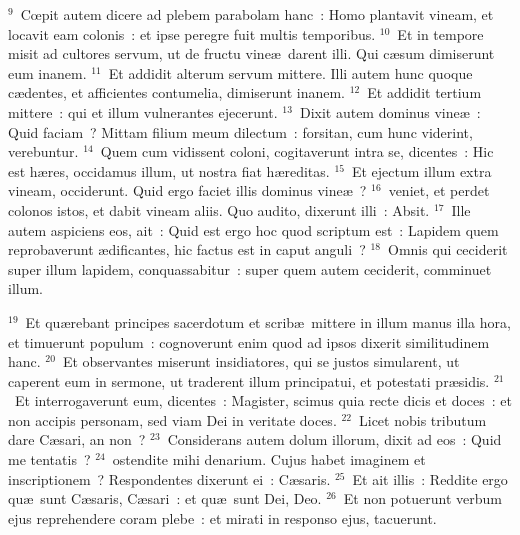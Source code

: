 ${}^{9}$~Cœpit autem dicere ad plebem parabolam hanc~: Homo plantavit vineam, et locavit eam colonis~: et ipse peregre fuit multis temporibus.
${}^{10}$~Et in tempore misit ad cultores servum, ut de fructu vine\ae\ darent illi. Qui c\ae sum dimiserunt eum inanem.
${}^{11}$~Et addidit alterum servum mittere. Illi autem hunc quoque c\ae dentes, et afficientes contumelia, dimiserunt inanem.
${}^{12}$~Et addidit tertium mittere~: qui et illum vulnerantes ejecerunt.
${}^{13}$~Dixit autem dominus vine\ae~: Quid faciam~? Mittam filium meum dilectum~: forsitan, cum hunc viderint, verebuntur.
${}^{14}$~Quem cum vidissent coloni, cogitaverunt intra se, dicentes~: Hic est h\ae res, occidamus illum, ut nostra fiat h\ae reditas.
${}^{15}$~Et ejectum illum extra vineam, occiderunt. Quid ergo faciet illis dominus vine\ae~?
${}^{16}$~veniet, et perdet colonos istos, et dabit vineam aliis. Quo audito, dixerunt illi~: Absit.
${}^{17}$~Ille autem aspiciens eos, ait~: Quid est ergo hoc quod scriptum est~: Lapidem quem reprobaverunt \ae dificantes, hic factus est in caput anguli~?
${}^{18}$~Omnis qui ceciderit super illum lapidem, conquassabitur~: super quem autem ceciderit, comminuet illum.


${}^{19}$~Et qu\ae rebant principes sacerdotum et scrib\ae\ mittere in illum manus illa hora, et timuerunt populum~: cognoverunt enim quod ad ipsos dixerit similitudinem hanc.
${}^{20}$~Et observantes miserunt insidiatores, qui se justos simularent, ut caperent eum in sermone, ut traderent illum principatui, et potestati pr\ae sidis.
${}^{21}$~Et interrogaverunt eum, dicentes~: Magister, scimus quia recte dicis et doces~: et non accipis personam, sed viam Dei in veritate doces.
${}^{22}$~Licet nobis tributum dare C\ae sari, an non~?
${}^{23}$~Considerans autem dolum illorum, dixit ad eos~: Quid me tentatis~?
${}^{24}$~ostendite mihi denarium. Cujus habet imaginem et inscriptionem~? Respondentes dixerunt ei~: C\ae saris.
${}^{25}$~Et ait illis~: Reddite ergo qu\ae\ sunt C\ae saris, C\ae sari~: et qu\ae\ sunt Dei, Deo.
${}^{26}$~Et non potuerunt verbum ejus reprehendere coram plebe~: et mirati in responso ejus, tacuerunt.


